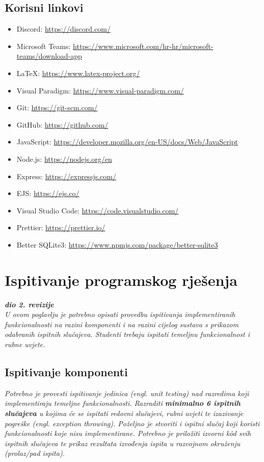 		\subsection*{Korisni linkovi}
			\begin{itemize}
				\item Discord: \url{https://discord.com/}
				\item Microsoft Teams: \url{https://www.microsoft.com/hr-hr/microsoft-teams/download-app}
				\item LaTeX: \url{https://www.latex-project.org/}
				\item Visual Paradigm: \url{https://www.visual-paradigm.com/}
				\item Git: \url{https://git-scm.com/}
				\item GitHub: \url{https://github.com/}
				\item JavaScript: \url{https://developer.mozilla.org/en-US/docs/Web/JavaScript}
				\item Node.js: \url{https://nodejs.org/en}
				\item Express: \url{https://expressjs.com/}
				\item EJS: \url{https://ejs.co/}
				\item Visual Studio Code: \url{https://code.visualstudio.com/}
				\item Prettier: \url{https://prettier.io/}
				\item Better SQLite3: \url{https://www.npmjs.com/package/better-sqlite3}
			\end{itemize}

				
			\eject 
		
	
		\section{Ispitivanje programskog rješenja}
			
			\textbf{\textit{dio 2. revizije}}\\
			
			 \textit{U ovom poglavlju je potrebno opisati provedbu ispitivanja implementiranih funkcionalnosti na razini komponenti i na razini cijelog sustava s prikazom odabranih ispitnih slučajeva. Studenti trebaju ispitati temeljnu funkcionalnost i rubne uvjete.}
	
			
			\subsection{Ispitivanje komponenti}
			\textit{Potrebno je provesti ispitivanje jedinica (engl. unit testing) nad razredima koji implementiraju temeljne funkcionalnosti. Razraditi \textbf{minimalno 6 ispitnih slučajeva} u kojima će se ispitati redovni slučajevi, rubni uvjeti te izazivanje pogreške (engl. exception throwing). Poželjno je stvoriti i ispitni slučaj koji koristi funkcionalnosti koje nisu implementirane. Potrebno je priložiti izvorni kôd svih ispitnih slučajeva te prikaz rezultata izvođenja ispita u razvojnom okruženju (prolaz/pad ispita). }
			
